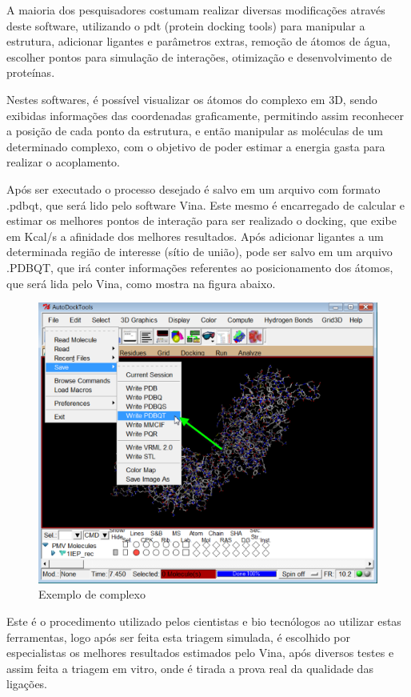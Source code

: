 \documentclass[tcc, capa]{texucpel}
\begin{document}
A maioria dos pesquisadores costumam realizar diversas modificações através deste software, utilizando o pdt (protein docking tools) para manipular a estrutura, adicionar ligantes e parâmetros extras, remoção de átomos de água, escolher pontos para simulação de interações, otimização e desenvolvimento de proteínas.

Nestes softwares, é possível visualizar os átomos do complexo em 3D, sendo exibidas informações das coordenadas graficamente, permitindo assim reconhecer a posição de cada ponto da estrutura, e então manipular as moléculas de um determinado complexo, com o objetivo de poder estimar a energia gasta para realizar o acoplamento. 

Após ser executado o processo desejado é salvo em um arquivo com formato .pdbqt, que será lido pelo software Vina. Este mesmo é encarregado de calcular e estimar os melhores pontos de interação para ser realizado o docking, que exibe em Kcal/s a afinidade dos melhores resultados.
Após adicionar ligantes a um determinada região de interesse (sítio de união), pode ser salvo em um arquivo .PDBQT, que irá conter informações referentes ao posicionamento dos átomos, que será lida pelo Vina, como mostra na figura abaixo.

      \begin{figure}[H]
	\centering
	\includegraphics[width=0.90\linewidth]{imagens/Autodock.png}
	\caption{Exemplo de complexo}
	\end{figure}

Este é o procedimento utilizado pelos cientistas e bio tecnólogos ao utilizar estas ferramentas, logo após ser feita esta triagem simulada, é escolhido por especialistas os melhores resultados estimados pelo Vina, após diversos testes e assim feita a triagem em vitro, onde é tirada a prova real da qualidade das ligações.
\end{document}
